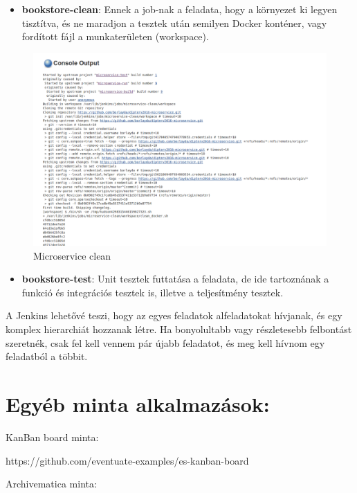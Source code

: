 \documentclass[11pt,magyar,a4paper,oneside,]{report}
\providecommand{\tightlist}{%
  \setlength{\itemsep}{0pt}\setlength{\parskip}{0pt}}
\let\Oldincludegraphics\includegraphics
\renewcommand{\includegraphics}[1]{
\begin{adjustbox}{max size={\textwidth}{\textheight}}
    \Oldincludegraphics[scale=0.6]{#1}%
\end{adjustbox}
}
\begin{document}
\begin{itemize}
\tightlist
\item
  \textbf{bookstore-clean}: Ennek a job-nak a feladata, hogy a környezet
  ki legyen tisztítva, és ne maradjon a tesztek után semilyen Docker
  konténer, vagy fordított fájl a munkaterületen (workspace).
\end{itemize}

\begin{figure}[htbp]
\centering
\includegraphics{img/jenkins-clean.png}
\caption{Microservice clean}
\end{figure}

\begin{itemize}
\tightlist
\item
  \textbf{bookstore-test}: Unit tesztek futtatása a feladata, de ide
  tartoznának a funkció és integrációs tesztek is, illetve a
  teljesítmény tesztek.
\end{itemize}

A Jenkins lehetővé teszi, hogy az egyes feladatok alfeladatokat
hívjanak, és egy komplex hierarchiát hozzanak létre. Ha bonyolultabb
vagy részletesebb felbontást szeretnék, csak fel kell vennem pár újabb
feladatot, és meg kell hívnom egy feladatból a többit.

\section{Egyéb minta
alkalmazások:}\label{egyuxe9b-minta-alkalmazuxe1sok}

KanBan board minta:

https://github.com/eventuate-examples/es-kanban-board

Archivematica minta:
\end{document}

